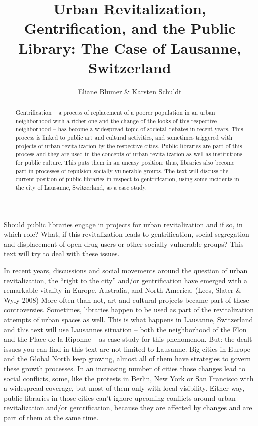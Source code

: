 \documentclass[a4paper,
fontsize=11pt,
oneside,
numbers=noperiodatend,
parskip=half-,
bibliography=totoc,
final
]{scrartcl}
\title{\LARGE{Urban Revitalization, Gentrification, and the Public Library: The Case of Lausanne, Switzerland}} %
\author{Eliane Blumer \& Karsten Schuldt} %
\date{}
\begin{document}
\maketitle
\thispagestyle{fancyplain} 

\begin{abstract}
Gentrification -- a process of replacement of a poorer population in an
urban neighborhood with a richer one and the change of the looks of this
respective neighborhood -- has become a widespread topic of societal
debates in recent years. This process is linked to public art and
cultural activities, and sometimes triggered with projects of urban
revitalization by the respective cities. Public libraries are part of
this process and they are used in the concepts of urban revitalization
as well as institutions for public culture. This puts them in an uneasy
position: thus, libraries also become part in processes of repulsion
socially vulnerable groups. The text will discuss the current position
of public libraries in respect to gentrification, using some incidents
in the city of Lausanne, Switzerland, as a case study.
\end{abstract}

Should public libraries engage in projects for urban revitalization and
if so, in which role? What, if this revitalization leads to
gentrification, social segregation and displacement of open drug users
or other socially vulnerable groups? This text will try to deal with
these issues.

In recent years, discussions and social movements around the question of
urban revitalization, the \enquote{right to the city} and/or
gentrification have emerged with a remarkable vitality in Europe,
Australia, and North America. (Lees, Slater \& Wyly 2008) More often
than not, art and cultural projects became part of these controversies.
Sometimes, libraries happen to be used as part of the revitalization
attempts of urban spaces as well. This is what happens in Lausanne,
Switzerland and this text will use Lausannes situation -- both the
neighborhood of the Flon and the Place de la Riponne -- as case study
for this phenomenon. But: the dealt issues you can find in this text are
not limited to Lausanne. Big cities in Europe and the Global North keep
growing, almost all of them have strategies to govern these growth
processes. In an increasing number of cities those changes lead to
social conflicts, some, like the protests in Berlin, New York or San
Francisco with a widespread coverage, but most of them only with local
visibility. Either way, public libraries in those cities can't ignore
upcoming conflicts around urban revitalization and/or gentrification,
because they are affected by changes and are part of them at the same
time.
\end{document}
